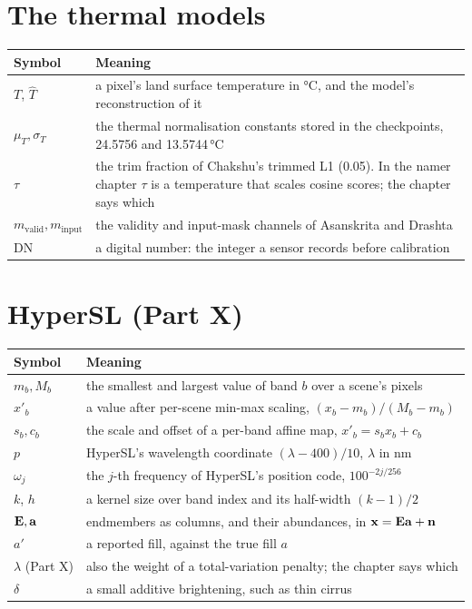 \section*{The thermal models}
\begin{longtable}{@{}p{30mm}p{110mm}@{}}
\toprule
Symbol & Meaning \\
\midrule\endhead
$T$, $\hat T$ & a pixel's land surface temperature in °C, and the model's reconstruction of it \\
$\mu_T, \sigma_T$ & the thermal normalisation constants stored in the checkpoints, 24.5756 and 13.5744\,°C \\
$\tau$ & the trim fraction of Chakshu's trimmed L1 (0.05). In the namer chapter $\tau$ is a temperature that scales
cosine scores; the chapter says which \\
$m_\text{valid}, m_\text{input}$ & the validity and input-mask channels of Asanskrita and Drashta \\
DN & a digital number: the integer a sensor records before calibration \\
\bottomrule
\end{longtable}

\section*{HyperSL (Part X)}
\begin{longtable}{@{}p{30mm}p{110mm}@{}}
\toprule
Symbol & Meaning \\
\midrule\endhead
$m_b, M_b$ & the smallest and largest value of band $b$ over a scene's pixels \\
$x'_b$ & a value after per-scene min-max scaling, $(x_b-m_b)/(M_b-m_b)$ \\
$s_b, c_b$ & the scale and offset of a per-band affine map, $x'_b = s_b x_b + c_b$ \\
$p$ & HyperSL's wavelength coordinate $(\lambda-400)/10$, $\lambda$ in nm \\
$\omega_j$ & the $j$-th frequency of HyperSL's position code, $100^{-2j/256}$ \\
$k$, $h$ & a kernel size over band index and its half-width $(k-1)/2$ \\
$\mathbf{E}, \mathbf{a}$ & endmembers as columns, and their abundances, in $\mathbf{x}=\mathbf{E}\mathbf{a}+\mathbf{n}$ \\
$a'$ & a reported fill, against the true fill $a$ \\
$\lambda$ (Part X) & also the weight of a total-variation penalty; the chapter says which \\
$\delta$ & a small additive brightening, such as thin cirrus \\
\bottomrule
\end{longtable}
